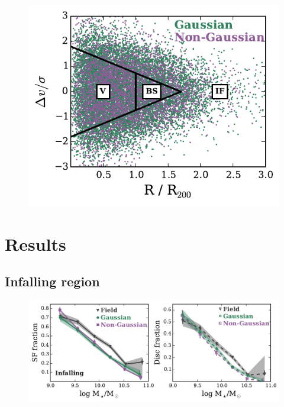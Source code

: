 \documentclass[a4paper,fleqn,usenatbib]{mnras}
\begin{document}
\begin{figure}
  \centering
  \includegraphics[width=\columnwidth]{vnorm_r.pdf}
  \caption{}
  \label{fig:vnorm_r}
\end{figure}


\section{Results}
\label{sec:results}

\subsection{Infalling region}

\begin{figure}
  \centering
  \includegraphics[width=\textwidth]{disk_sfFrac_w2_if.pdf}
  \caption{}
  \label{fig:disk_sfFrac_if}
\end{figure}
\end{document}
